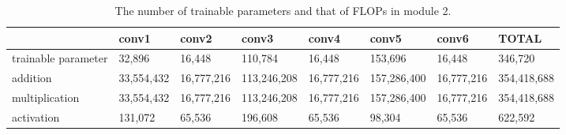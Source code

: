 \documentclass[10pt]{article}
\begin{document}
\begin{table}[!h]
    \begin{center}
        \begin{tabular}{llllllll}
                    & conv1    & conv2    & conv3     & conv4    & conv5     & conv6    & TOTAL     \\
                    \hline \hline
        trainable parameter & 32,896    & 16,448    & 110,784    & 16,448    & 153,696    & 16,448    & 346,720    \\
        addition            & 33,554,432 & 16,777,216 & 113,246,208 & 16,777,216 & 157,286,400 & 16,777,216 & 354,418,688 \\
        multiplication      & 33,554,432 & 16,777,216 & 113,246,208 & 16,777,216 & 157,286,400 & 16,777,216 & 354,418,688 \\
        activation          & 131,072   & 65,536    & 196,608    & 65,536    & 98,304     & 65,536    & 622,592   
        \end{tabular}
    \end{center}
    \caption{The number of trainable parameters and that of FLOPs in module 2.}
    \label{tab2}
\end{table}
\end{document}
